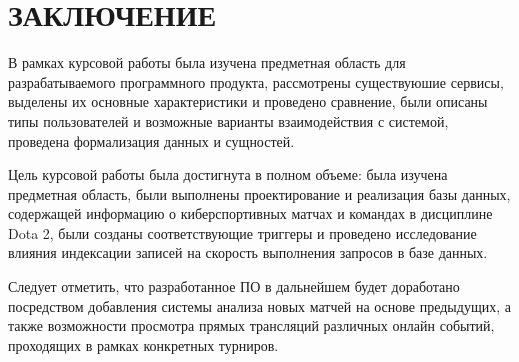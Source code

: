 \chapter*{ЗАКЛЮЧЕНИЕ}

В рамках курсовой работы была изучена предметная область для разрабатываемого программного продукта, рассмотрены существуюшие сервисы, выделены их основные характеристики и проведено сравнение, были описаны типы пользователей и возможные варианты взаимодействия с системой, проведена формализация данных и сущностей.

Цель курсовой работы была достигнута в полном объеме: была изучена предметная область, были выполнены проектирование и реализация базы данных, содержащей информацию о киберспортивных матчах и командах в дисциплине Dota 2, были созданы соответствующие триггеры и проведено исследование влияния индексации записей на скорость выполнения запросов в базе данных.

Следует отметить, что разработанное ПО в дальнейшем будет доработано посредством добавления системы анализа новых матчей на основе предыдущих, а также возможности просмотра прямых трансляций различных онлайн событий, проходящих в рамках конкретных турниров. 


